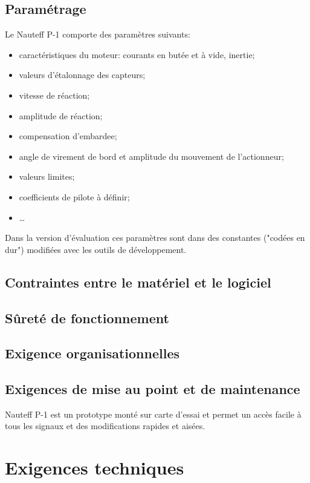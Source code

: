 \documentclass[a4paper,11pt]{report}
\begin{document}
\subsection{Paramétrage}
Le Nauteff P-1 comporte des paramètres suivants:
\begin{itemize}
	\item caractéristiques du moteur: courants en butée et à vide, inertie;
	\item valeurs d'étalonnage des capteurs;
	\item vitesse de réaction;
	\item amplitude de réaction;
	\item compensation d'\gls{embardee};
	\item angle de virement de bord et amplitude du mouvement de l'actionneur;
	\item valeurs limites;
	\item coefficients de pilote à définir;
	\item \ldots
\end{itemize}
Dans la version d'évaluation ces paramètres sont dans des constantes
("codées en dur") modifiées avec les outils de développement.

\subsection{Contraintes entre le matériel et le logiciel}
\subsection{Sûreté de fonctionnement}

\subsection{Exigence organisationnelles}

\subsection{Exigences de mise au point et de maintenance}
Nauteff P-1 est un prototype monté sur carte d'essai et permet un
accès facile à tous les signaux et des modifications rapides et aisées.

\section{Exigences techniques}
\end{document}
